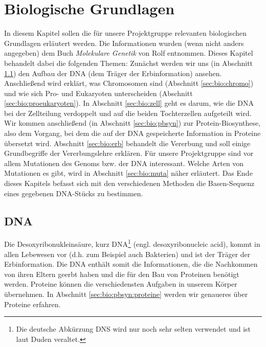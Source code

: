 \chapter{Biologische Grundlagen}
\label{sec:bio}
In diesem Kapitel sollen die für unsere Projektgruppe relevanten biologischen Grundlagen erläutert werden. Die Informationen wurden (wenn nicht anders angegeben) dem Buch \textit{Molekulare Genetik} von Rolf \citet{Knippers2006} entnommen. Dieses Kapitel behandelt dabei die folgenden Themen:
Zunächst werden wir uns (in Abschnitt \ref{sec:bio:dna}) den Aufbau der DNA (dem Träger der Erbinformation) ansehen. Anschließend wird erklärt, was Chromosomen sind (Abschnitt \ref{sec:bio:chromo}) und wie sich Pro- und Eukaryoten unterscheiden (Abschnitt \ref{sec:bio:proeukaryoten}). In Abschnitt \ref{sec:bio:zell} geht es darum, wie die DNA bei der Zellteilung verdoppelt und auf die beiden Tochterzellen aufgeteilt wird. Wir kommen anschließend (in Abschnitt \ref{sec:bio:pbsyn}) zur Protein-Biosynthese, also dem Vorgang, bei dem die auf der DNA gespeicherte Information in Proteine übersetzt wird. Abschnitt \ref{sec:bio:erb} behandelt die Vererbung und soll einige Grundbegriffe der Vererbungslehre erklären. Für unsere Projektgruppe sind vor allem Mutationen des Genoms bzw. der DNA interessant. Welche Arten von Mutationen es gibt, wird in Abschnitt \ref{sec:bio:muta} näher erläutert. Das Ende dieses Kapitels befasst sich mit den verschiedenen Methoden die Basen-Sequenz eines gegebenen DNA-Stücks zu bestimmen.  

\section{DNA}
\label{sec:bio:dna}
Die Desoxyribonukleinsäure, kurz DNA\footnote{Die deutsche Abkürzung DNS wird nur noch sehr selten verwendet und ist laut Duden veraltet.} (engl. desoxyribonucleic acid), kommt in allen Lebewesen vor (d.h. zum Beispiel auch  Bakterien) und ist der Träger der Erbinformation. Die DNA enthält somit die Informationen, die die Nachkommen von ihren  Eltern geerbt haben und die für den Bau von Proteinen benötigt werden. Proteine können die verschiedensten Aufgaben  in unserem Körper übernehmen. In Abschnitt \ref{sec:bio:pbsyn:proteine} werden wir genaueres über Proteine erfahren.

